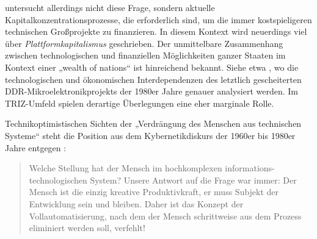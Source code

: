 \documentclass[11pt,a4paper]{article}
\begin{document}
\cite{Goldberg2016} untersucht allerdings nicht diese Frage, sondern aktuelle
Kapitalkonzentrationsprozesse, die erforderlich sind, um die immer
kostspieligeren technischen Großprojekte zu finanzieren.  In diesem Kontext
wird neuerdings viel über \emph{Plattformkapitalismus} geschrieben.  Der
unmittelbare Zusammenhang zwischen technologischen und finanziellen
Möglichkeiten ganzer Staaten im Kontext einer „wealth of nations“ ist
hinreichend bekannt. Siehe etwa \cite{Barkleit2000}, wo die technologischen
und ökonomischen Interdependenzen des letztlich gescheiterten
DDR-Mikroelektronikprojekts der 1980er Jahre genauer analysiert werden. Im
TRIZ-Umfeld spielen derartige Überlegungen eine eher marginale Rolle.

Technikoptimistischen Sichten der „Verdrängung des Menschen aus technischen
Systeme“ steht die Position aus dem Kybernetikdiskurs der 1960er bis 1980er
Jahre entgegen \cite[S. 10]{KFK2000}:
\begin{quote}
  Welche Stellung hat der Mensch im hochkomplexen informations-technologischen
  System? Unsere Antwort auf die Frage war immer: Der Mensch ist die einzig
  kreative Produktivkraft, er muss Subjekt der Entwicklung sein und bleiben.
  Daher ist das Konzept der Vollautomatisierung, nach dem der Mensch
  schrittweise aus dem Prozess eliminiert werden soll, verfehlt!
\end{quote}
\end{document}
